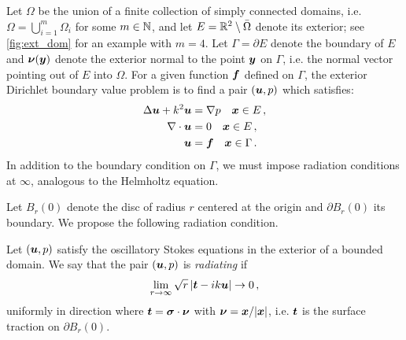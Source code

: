 Let $\Omega$ be the union of a finite collection of
simply connected domains, i.e. $\Omega = \bigcup_{i=1}^m \Omega_i$
for some $m \in \mathbb{N}$,
and let $E = \mathbb{R}^{2} \setminus \bar{\Omega}$ denote its
exterior; see \cref{fig:ext_dom} for an example with $m=4$.
%
Let $\Gamma = \partial E$ denote the boundary of $E$ and
${\boldsymbol \nu}({\boldsymbol y})$ denote the exterior normal to the point ${\boldsymbol y}$ on
$\Gamma$, i.e. the normal vector pointing out of $E$ into $\Omega$.
%
For a given function ${\boldsymbol f}$ defined on $\Gamma$,
the exterior Dirichlet boundary value problem is to
find a pair $({\boldsymbol u},p)$ which satisfies:
\begin{equation}
\begin{aligned}
\Delta {\boldsymbol u} + k^{2} {\boldsymbol u} &= \nabla p \quad {\boldsymbol x} \in E \, ,\\
\nabla \cdot {\boldsymbol u} &= 0 \quad {\boldsymbol x} \in E \, ,  \\
{\boldsymbol u} &= {\boldsymbol f} \quad {\boldsymbol x} \in \Gamma \, . \nonumber
\end{aligned}
\end{equation}
In addition to the boundary condition on
$\Gamma$, we must impose radiation conditions
at $\infty$, analogous to the Helmholtz equation.
%

Let $B_r(0)$ denote the disc of radius $r$ centered
at the origin and $\partial B_r(0)$ its boundary.
%
We propose the following radiation condition.

\begin{definition} \label{def:radcond}
Let $({\boldsymbol u},p)$ satisfy the oscillatory Stokes equations in
the exterior of a bounded domain. We say that
the pair $({\boldsymbol u},p)$ is {\em radiating} if
\begin{equation}
\lim_{r\to \infty} \sqrt{r} \left| {\boldsymbol t} - i k {\boldsymbol u} \right| \to 0 \, ,
\label{eq:radcond}
\end{equation}
uniformly in direction where ${\boldsymbol t} = {\boldsymbol \sigma} \cdot {\boldsymbol \nu}$
with ${\boldsymbol \nu} = {\boldsymbol x}/|{\boldsymbol x}|$, i.e. ${\boldsymbol t}$ is the surface
traction on $\partial B_r(0)$.     
\end{definition}

